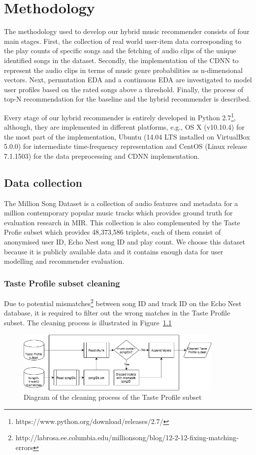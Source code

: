 \chapter{Methodology}
\label{ch:methodology}
The methodology used to develop our hybrid music recommender consists of four main stages. First, the collection of real world user-item data corresponding to the play counts of specific songs and the fetching of audio clips of the unique identified songs in the dataset. Secondly, the implementation of the CDNN to represent the audio clips in terms of music genre probabilities as n-dimensional vectors. Next, permutation EDA and a continuous EDA are investigated to model user profiles based on the rated songs above a threshold. Finally, the process of top-N recommendation for the baseline and the hybrid recommender is described.

Every stage of our hybrid recommender is entirely developed in Python 2.7\footnote{https://www.python.org/download/releases/2.7/}, although, they are implemented in different platforms, e.g., OS X (v10.10.4) for the most part of the implementation, Ubuntu (14.04 LTS installed on VirtualBox 5.0.0) for intermediate time-frequency representation and CentOS (Linux release 7.1.1503) for the data preprocessing and CDNN implementation.

\section{Data collection}
The Million Song Dataset \parencite{Bertin-Mahieux2011} is a collection of audio features and metadata for a million contemporary popular music tracks which provides ground truth for evaluation research in MIR. This collection is also complemented by the Taste Profie subset which provides 48,373,586 triplets, each of them consist of anonymised user ID, Echo Nest song ID and play count. We choose this dataset because it is publicly available data and it contains enough data for user modelling and recommender evaluation.

\subsection{Taste Profile subset cleaning}
Due to potential mismatches\footnote{http://labrosa.ee.columbia.edu/millionsong/blog/12-2-12-fixing-matching-errors} between song ID and  track ID on the Echo Nest database, it is required to filter out the wrong matches in the Taste Profile subset. The cleaning process is illustrated in Figure~\ref{fig:taste_profile} 
\begin{figure}[ht!]
	\centering
	\includegraphics[width=0.9\textwidth]{chapter3/taste_profile.png}
	\caption{Diagram of the cleaning process of the Taste Profile subset}
	\label{fig:taste_profile}
\end{figure}

